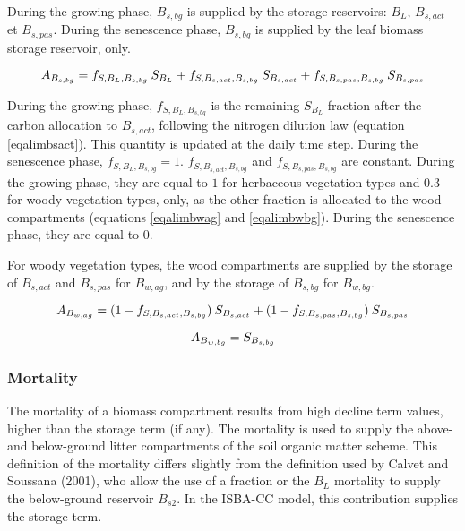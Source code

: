 {During the growing phase, $B_{s,bg}$ is supplied by the storage reservoirs: $B_L$, $B_{s,act}$ et $B_{s,pas}$. 
During the senescence phase, $B_{s,bg}$ is supplied by the leaf biomass storage reservoir, only.

\begin{equation}
A_{B_{s,bg}} = f_{S,B_L,B_{s,bg}} \: S_{B_L} + f_{S,B_{s,act},B_{s,bg}} \: S_{B_{s,act}} 
    + f_{S,B_{s,pas},B_{s,bg}} \: S_{B_{s,pas}} \\ 
\end{equation}

During the growing phase,
$f_{S,B_L,B_{s,bg}}$ is the remaining $S_{B_L}$ fraction after the carbon allocation to 
$B_{s,act}$, following the nitrogen dilution law 
(equation \ref{eqalimbsact}). This quantity is updated at the daily time step. 
During the senescence phase, $f_{S,B_L,B_{s,bg}} = 1$.
$f_{S,B_{s,act},B_{s,bg}}$ and $f_{S,B_{s,pas},B_{s,bg}}$ are constant.
During the growing phase, they are equal to 
$1$ for herbaceous vegetation types and $0.3$ for woody 
vegetation types, only, as the other fraction is allocated to the wood compartments 
(equations \ref{eqalimbwag} and \ref{eqalimbwbg}).
During the senescence phase, they are equal to $0$.


For woody vegetation types, the wood compartments are supplied by 
the storage of $B_{s,act}$ and $B_{s,pas}$ for $B_{w,ag}$, and by 
the storage of $B_{s,bg}$ for $B_{w,bg}$. 

\begin{equation}
A_{B_{w,ag}} = (1-f_{S,B_{s,act},B_{s,bg}}) \: S_{B_{s,act}} 
    + (1-f_{S,B_{s,pas},B_{s,bg}}) \: S_{B_{s,pas}} \\ 
\label{eqalimbwag}
\end{equation}

\begin{equation}
A_{B_{w,bg}} = S_{B_{s,bg}} \\
\label{eqalimbwbg}
\end{equation}



\subsubsection{Mortality}

The mortality of a biomass compartment results from high decline term values, 
higher than the storage term (if any).
The mortality is used to supply the above- and below-ground litter compartments 
of the soil organic matter scheme. 
This definition of the mortality differs slightly from the definition used by 
Calvet and Soussana (2001), who allow the use of a fraction or the $B_L$ mortality 
to supply the below-ground reservoir $B_{s2}$. In the ISBA-CC model, this contribution 
supplies the storage term.


}
